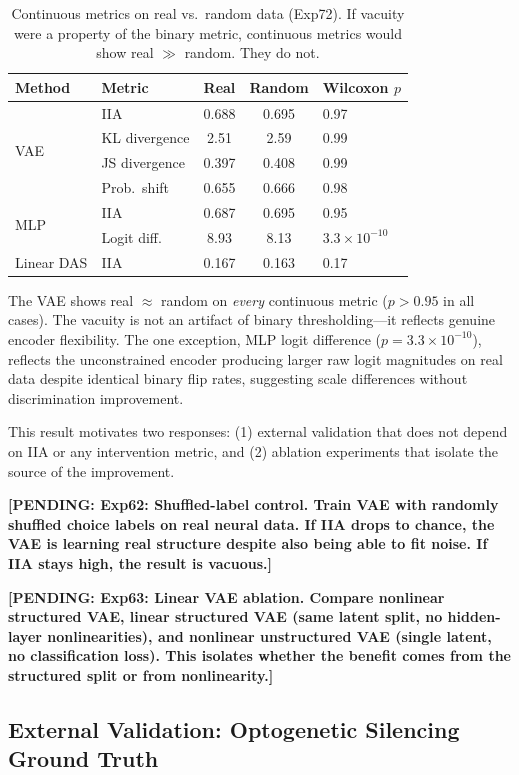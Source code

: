 \documentclass{article}
\newcommand{\pending}[1]{\textcolor{red!70!black}{\textbf{[PENDING: #1]}}}
\begin{document}
\begin{table}[h]
\centering
\small
\caption{Continuous metrics on real vs.\ random data (Exp72). If vacuity were a property of the binary metric, continuous metrics would show real $\gg$ random. They do not.}
\label{tab:continuous}
\begin{tabular}{llccl}
\toprule
Method & Metric & Real & Random & Wilcoxon $p$ \\
\midrule
\multirow{4}{*}{VAE} & IIA & 0.688 & 0.695 & 0.97 \\
 & KL divergence & 2.51 & 2.59 & 0.99 \\
 & JS divergence & 0.397 & 0.408 & 0.99 \\
 & Prob.\ shift & 0.655 & 0.666 & 0.98 \\
\midrule
\multirow{2}{*}{MLP} & IIA & 0.687 & 0.695 & 0.95 \\
 & Logit diff.\ & 8.93 & 8.13 & $3.3 \times 10^{-10}$ \\
\midrule
Linear DAS & IIA & 0.167 & 0.163 & 0.17 \\
\bottomrule
\end{tabular}
\end{table}

The VAE shows real $\approx$ random on \emph{every} continuous metric ($p > 0.95$ in all cases). The vacuity is not an artifact of binary thresholding---it reflects genuine encoder flexibility. The one exception, MLP logit difference ($p = 3.3 \times 10^{-10}$), reflects the unconstrained encoder producing larger raw logit magnitudes on real data despite identical binary flip rates, suggesting scale differences without discrimination improvement.

This result motivates two responses: (1) external validation that does not depend on IIA or any intervention metric, and (2) ablation experiments that isolate the source of the improvement.

\pending{Exp62: Shuffled-label control. Train VAE with randomly shuffled choice labels on real neural data. If IIA drops to chance, the VAE is learning real structure despite also being able to fit noise. If IIA stays high, the result is vacuous.}

\pending{Exp63: Linear VAE ablation. Compare nonlinear structured VAE, linear structured VAE (same latent split, no hidden-layer nonlinearities), and nonlinear unstructured VAE (single latent, no classification loss). This isolates whether the benefit comes from the structured split or from nonlinearity.}

\subsection{External Validation: Optogenetic Silencing Ground Truth}
\end{document}
